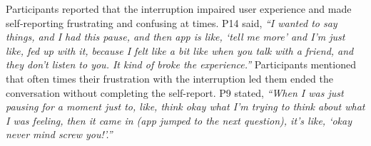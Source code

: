         Participants reported that the interruption impaired user experience and made self-reporting frustrating and confusing at times.
        P14 said,
                \textit{``I wanted to say things, and I had this pause, and then \acl{app} is like, `tell me more' and I'm just like, fed up with it, because I felt like a bit like when you talk with a friend, and they don't listen to you. It kind of broke the experience.''}
        Participants mentioned that often times their frustration with the interruption led them ended the conversation without completing the self-report. P9 stated,
            \textit{
            ``When I was just pausing for a moment just to, like, think okay what I'm trying to think about what I was feeling, then it came in (\acl{app} jumped to the next question), it's like, `okay never mind screw you!'.''
            }

